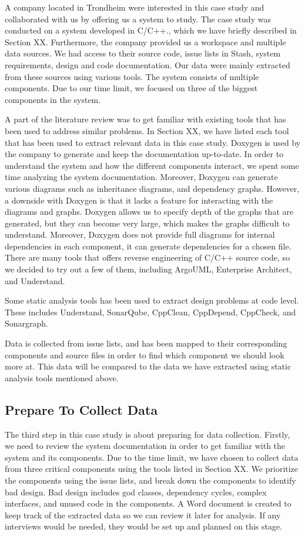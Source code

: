 A company located in Trondheim were interested in this case study and collaborated with us by offering us a system to study. The case study was conducted on a system developed in C/C++., which we have briefly described in Section XX. Furthermore, the company provided us a workspace and multiple data sources. We had access to their source code, issue lists in Stash, system requirements, design and code documentation. Our data were mainly extracted from these sources using various tools. The system consists of multiple components. Due to our time limit, we focused on three of the biggest components in the system. 

A part of the literature review was to get familiar with existing tools that has been used to address similar problems. In Section XX, we have listed each tool that has been used to extract relevant data in this case study. Doxygen is used by the company to generate and keep the documentation up-to-date. In order to understand the system and how the different components interact, we spent some time analyzing the system documentation. Moreover, Doxygen can generate various diagrams such as inheritance diagrams, and dependency graphs. However, a downside with Doxygen is that it lacks a feature for interacting with the diagrams and graphs. Doxygen allows us to specify depth of the graphs that are generated, but they can become very large, which makes the graphs difficult to understand. Moreover, Doxygen does not provide full diagrams for internal dependencies in each component, it can generate dependencies for a chosen file. There are many tools that offers reverse engineering of C/C++ source code, so we decided to try out a few of them, including ArgoUML, Enterprise Architect, and Understand. 

Some static analysis tools has been used to extract design problems at code level. These includes Understand, SonarQube, CppClean, CppDepend, CppCheck, and Sonargraph. 

Data is collected from issue lists, and has been mapped to their corresponding components and source files in order to find which component we should look more at. This data will be compared to the data we have extracted using static analysis tools mentioned above.




\subsection{Prepare To Collect Data}
The third step in this case study is about preparing for data collection. Firstly, we need to review the system documentation in order to get familiar with the system and its components. Due to the time limit, we have chosen to collect data from three critical components using the tools listed in Section XX. We prioritize the components using the issue lists, and break down the components to identify bad design. Bad design includes god classes, dependency cycles, complex interfaces, and unused code in the components. A Word document is created to keep track of the extracted data so we can review it later for analysis. If any interviews would be needed, they would be set up and planned on this stage. 

